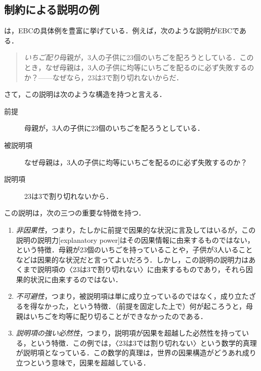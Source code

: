 \documentclass[dvipdfmx,twoside,11pt,uplatex]{jsarticle}
\theoremstyle{definition}
\begin{document}
\subsection{制約による説明の例}\label{examples}
\cite{lange2016bwc,Lange2018bwcsum}は，EBCの具体例を豊富に挙げている．例えば，次のような説明がEBCである．
\begin{quote}
    \emph{いちご配り}\quad 母親が，3人の子供に23個のいちごを配ろうとしている．このとき，なぜ母親は，3人の子供に均等にいちごを配るのに必ず失敗するのか？------なぜなら，23は3で割り切れないからだ．
\end{quote}
さて，この説明は次のような構造を持つと言える．
\begin{description}
    \item[前提] 母親が，3人の子供に23個のいちごを配ろうとしている．
    \item[被説明項] なぜ母親は，3人の子供に均等にいちごを配るのに必ず失敗するのか？
    \item[説明項] 23は3で割り切れないから．
\end{description}
この説明は，次の三つの重要な特徴を持つ\citep[15--6]{Lange2018bwcsum}．
\begin{enumerate}
    \item \emph{非因果性}，つまり，たしかに前提で因果的な状況に言及してはいるが，この説明の説明力[explanatory power]はその因果情報に由来するものではない，という特徴．母親が23個のいちごを持っていることや，子供が3人いることなどは因果的な状況だと言ってよいだろう．しかし，この説明の説明力はあくまで説明項の〈23は3で割り切れない〉に由来するものであり，それら因果的状況に由来するのではない．
    \item \emph{不可避性}，つまり，被説明項は単に成り立っているのではなく，成り立たざるを得なかった，という特徴．（前提を固定した上で）何が起ころうと，母親はいちごを均等に配り切ることができなかったのである．
    \item \emph{説明項の強い必然性}，つまり，説明項が因果を超越した必然性を持っている，という特徴．この例では，〈23は3では割り切れない〉という数学的真理が説明項となっている．この数学的真理は，世界の因果構造がどうあれ成り立つという意味で，因果を超越している．
\end{enumerate}
\end{document}
